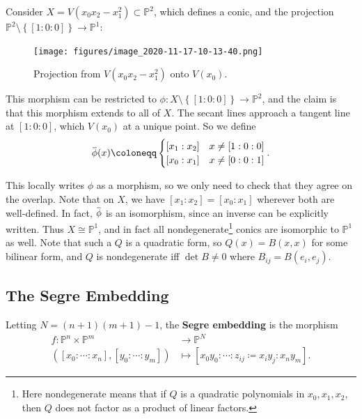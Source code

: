 \begin{example}[?]

Consider \(X = V(x_0 x_2 - x_1^2) \subset {\mathbb{P}}^2\), which
defines a conic, and the projection
\({\mathbb{P}}^2 \setminus\left\{{[1:0:0]}\right\} \to {\mathbb{P}}^1\):

\begin{figure}
\centering
\texttt{[image: figures/image\_2020-11-17-10-13-40.png]}
\caption{Projection from \(V(x_0 x_2 - x_1^2)\) onto \(V(x_0)\).}
\end{figure}

This morphism can be restricted to
\(\phi: X\setminus\left\{{[1:0:0]}\right\} \to {\mathbb{P}}^2\), and the
claim is that this morphism extends to all of \(X\). The secant lines
approach a tangent line at \([1:0:0]\), which \(V(x_0)\) at a unique
point. So we define
\begin{align*}  
\mkern 1.5mu\overline{\mkern-1.5mu\phi\mkern-1.5mu}\mkern 1.5mu(x) \coloneqq
\begin{cases}
[x_1: x_2] & x \neq [1:0:0] \\
[x_0: x_1] & x \neq [0:0:1]
\end{cases}
.\end{align*}

This locally writes \(\phi\) as a morphism, so we only need to check
that they agree on the overlap. Note that on \(X\), we have
\([x_1: x_2] = [x_0 : x_1]\) wherever both are well-defined. In fact,
\(\mkern 1.5mu\overline{\mkern-1.5mu\phi\mkern-1.5mu}\mkern 1.5mu\) is
an isomorphism, since an inverse can be explicitly written. Thus
\(X\cong {\mathbb{P}}^1\), and in fact all nondegenerate\footnote{Here
  nondegenerate means that if \(Q\) is a quadratic polynomials in
  \(x_0, x_1, x_2\), then \(Q\) does not factor as a product of linear
  factors.} conics are isomorphic to \({\mathbb{P}}^1\) as well. Note
that such a \(Q\) is a quadratic form, so \(Q(x) = B(x, x)\) for some
bilinear form, and \(Q\) is nondegenerate iff \(\det B \neq 0\) where
\(B_{ij} = B(e_i, e_j)\).

\end{example}

\hypertarget{the-segre-embedding}{%
\subsection{The Segre Embedding}\label{the-segre-embedding}}

\begin{definition}

Letting \(N = (n+1)(m+1) - 1\), the \textbf{Segre embedding} is the
morphism
\begin{align*}  
f: {\mathbb{P}}^n \times{\mathbb{P}}^m &\to {\mathbb{P}}^N \\
([x_0: \cdots : x_n], [y_0: \cdots : y_m]) &\mapsto
[x_0 y_0 : \cdots : z_{ij} \coloneqq x_i y_j : x_n y_m]
.\end{align*}

\end{definition}

